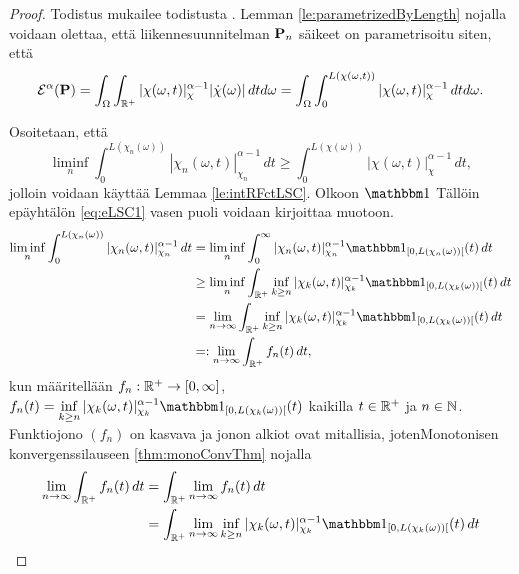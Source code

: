 \begin{proof}
    Todistus mukailee todistusta \cite[p. 37]{OptimalTransportationNetworks}. Lemman \ref{le:parametrizedByLength} nojalla voidaan olettaa, että liikennesuunnitelman $\P_n$ säikeet on parametrisoitu siten, että 
    \begin{equation}
         \E^\alpha(\P) = \int_\Omega \int_{\R^+}|\chi(\omega, t)|^{\alpha-1}_\chi|\dot\chi(\omega)| \, dtd\omega = \int_\Omega \int_{0}^{L(\chi(\omega, t))}|\chi(\omega, t)|^{\alpha-1}_\chi \, dtd\omega.
    \end{equation}
    
    Osoitetaan, että
    \begin{equation}\label{eq:eLSC1}
      \liminf_{n} \int_0^{L(\chi_n(\omega))}|\chi_n(\omega, t)|_{\chi_n}^{\alpha-1}\, dt \ge \int_0^{L(\chi(\omega))}|\chi(\omega, t)|_{\chi}^{\alpha-1} \, dt,
    \end{equation}
    jolloin voidaan käyttää Lemmaa \ref{le:intRFctLSC}.
    Olkoon $\indfct{}$  Tällöin epäyhtälön \ref{eq:eLSC1} vasen puoli voidaan kirjoittaa muotoon.
    \begin{align*}
        \liminf_{n} \int_0^{L(\chi_n(\omega))} |\chi_n(\omega, t)|_{\chi_n}^{\alpha-1} \, dt &= \liminf_{n} \int_0^\infty |\chi_n(\omega, t)|_{\chi_n}^{\alpha-1} \indfct{[0,L(\chi_n(\omega))[}(t) \, dt \\
        &\ge \liminf_n \int_\Rp \inf_{k \ge n} |\chi_k(\omega, t)|_{\chi_k}^{\alpha-1} \indfct{[0, L(\chi_k(\omega))[}(t) \, dt \\
        &=\lim_{n\to \infty} \int_\Rp \inf_{k \ge n} |\chi_k(\omega, t)|_{\chi_k}^{\alpha-1} \indfct{[0, L(\chi_k(\omega))[}(t) \, dt \\
        &=: \lim_{n \to \infty}  \int_\Rp f_n(t) \, dt,
    \end{align*}
    kun määritellään $f_n: \Rp \to [0, \infty]$, $\displaystyle f_n(t) = \inf_{k \ge n} |\chi_k(\omega, t)|_{\chi_k}^{\alpha-1} \indfct{[0, L(\chi_k(\omega))[}(t)$ kaikilla $t \in \Rp$ ja $n \in \N$. Funktiojono $(f_n)$ on kasvava ja jonon alkiot ovat mitallisia, jotenMonotonisen konvergenssilauseen \ref{thm:monoConvThm} nojalla 
    \begin{align*}
        \lim_{n \to \infty}  \int_\Rp f_n(t) \, dt &= \int_\Rp \lim_{n\to\infty}f_n(t) \, dt \\
        &= \int_\Rp \lim_{n \to \infty}  \inf_{k \ge n} |\chi_k(\omega, t)|_{\chi_k}^{\alpha-1} \indfct{[0, L(\chi_k(\omega))[}(t) \, dt \\

\end{align*}
\end{proof}
